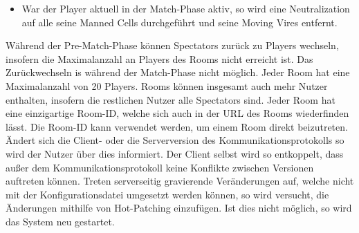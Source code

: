 \begin{description}
\begin{itemize}
			\item War der Player aktuell in der Match-Phase aktiv, so wird eine Neutralization auf alle seine Manned Cells durchgeführt und seine Moving Vires entfernt.
		\end{itemize}
		Während der Pre-Match-Phase können Spectators zurück zu Players wechseln, insofern die Maximalanzahl an Players des Rooms nicht erreicht ist. Das Zurückwechseln is während der Match-Phase nicht möglich.
		Jeder Room hat eine Maximalanzahl von 20 Players. Rooms können insgesamt auch mehr Nutzer enthalten, insofern die restlichen Nutzer alle Spectators sind.
		Jeder Room hat eine einzigartige Room-ID, welche sich auch in der URL des Rooms wiederfinden lässt. Die Room-ID kann verwendet werden, um einem Room direkt beizutreten.
		Ändert sich die Client- oder die Serverversion des Kommunikationsprotokolls so wird der Nutzer über dies informiert. Der Client selbst wird so entkoppelt, dass außer dem Kommunikationsprotokoll keine Konflikte zwischen Versionen auftreten können. Treten serverseitig gravierende Veränderungen auf, welche nicht mit der Konfigurationsdatei umgesetzt werden können, so wird versucht, die Änderungen mithilfe von Hot-Patching einzufügen. Ist dies nicht möglich, so wird das System neu gestartet.
\end{description}

